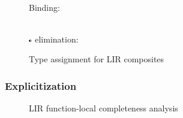 \documentclass[index.tex]{subfiles}
\begin{document}
\begin{figure}
\begin{mathpar}
  \end{mathpar} \\
  Binding:
  \begin{mathpar}
  \end{mathpar} \\
  $\CII$ elimination:
  \begin{mathpar}
  \end{mathpar}
  \caption{Type assignment for LIR composites}
  \label{fig:lir-ta-comp}
\end{figure}

\subsubsection{Explicitization}
\label{sec:explicitization}

\begin{figure}
  \caption{LIR function-local completeness analysis}
  \label{fig:lir-completeness-analysis-local}
\end{figure}
   
\end{document}
